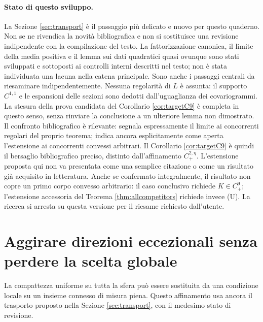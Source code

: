 \documentclass[11pt,a4paper]{article}
\theoremstyle{remark}
\begin{document}
\paragraph{Stato di questo sviluppo.}
La Sezione \ref{sec:transport} è il passaggio più delicato e nuovo per
questo quaderno. Non se ne rivendica la novità bibliografica e non si
sostituisce una revisione indipendente con la compilazione del testo.
La fattorizzazione canonica, il limite della media positiva e il lemma
sui dati quadratici quasi ovunque sono stati sviluppati e sottoposti
ai controlli interni descritti nel testo; non è stata individuata una
lacuna nella catena principale. Sono anche i passaggi centrali da
riesaminare indipendentemente. Nessuna regolarità di $L$ è assunta:
il supporto $C^{1,1}$ e le espansioni delle sezioni sono dedotti
dall'uguaglianza dei covariogrammi. La stesura della prova candidata
del Corollario \ref{cor:targetC9} è completa in questo senso, senza
rinviare la conclusione a un ulteriore lemma non dimostrato.
Il confronto bibliografico è rilevante: \cite[Osservazione 5.2]{B16}
segnala espressamente il limite ai concorrenti regolari del proprio
teorema; \cite[p.~23 del manoscritto, dopo il Teorema 3.25]{B23}
indica ancora esplicitamente come aperta l'estensione ai concorrenti
convessi arbitrari. Il Corollario \ref{cor:targetC9} è quindi il
bersaglio bibliografico preciso, distinto dall'affinamento $C^{2,\eta}_+$.
L'estensione proposta qui non va presentata come una
semplice citazione o come un risultato già acquisito in letteratura.
Anche se confermato integralmente, il risultato non copre un primo
corpo convesso arbitrario: il caso conclusivo richiede $K\in C^9_+$;
l'estensione accessoria del Teorema \ref{thm:allcompetitors} richiede
invece (U). La ricerca si arresta su questa versione per il riesame
richiesto dall'utente.

\section{Aggirare direzioni eccezionali senza perdere la scelta globale}
\label{sec:exceptional}
La compattezza uniforme su tutta la sfera può essere sostituita da una
condizione locale su un insieme connesso di misura piena. Questo
affinamento usa ancora il trasporto proposto nella Sezione
\ref{sec:transport}, con il medesimo stato di revisione.
\end{document}
